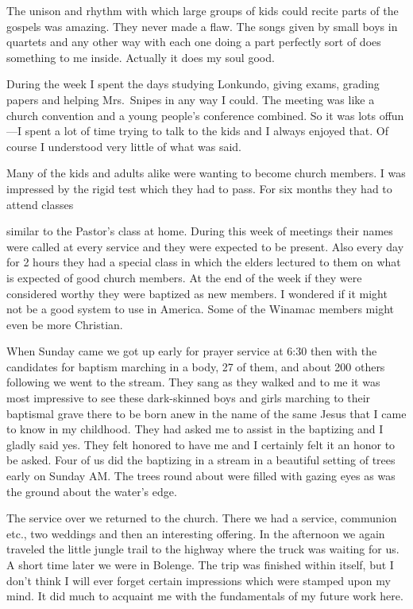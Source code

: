 \documentclass[
]{book}
\begin{document}
The unison and rhythm with which large groups of kids could recite parts of the gospels was amazing. They never made a flaw. The songs given by small boys in quartets and any other way with each one doing a part perfectly sort of does something to me inside. Actually it does my soul good.

During the week I spent the days studying Lonkundo, giving exams, grading papers and helping Mrs.~Snipes in any way I could. The meeting was like a church convention and a young people's conference combined. So it was lots offun---I spent a lot of time trying to talk to the kids and I always enjoyed that. Of course I understood very little of what was said.

Many of the kids and adults alike were wanting to become church members. I was impressed by the rigid test which they had to pass. For six months they had to attend classes

similar to the Pastor's class at home. During this week of meetings their names were called at every service and they were expected to be present. Also every day for 2 hours they had a special class in which the elders lectured to them on what is expected of good church members. At the end of the week if they were considered worthy they were baptized as new members. I wondered if it might not be a good system to use in America. Some of the Winamac members might even be more Christian.

When Sunday came we got up early for prayer service at 6:30 then with the candidates for baptism marching in a body, 27 of them, and about 200 others following we went to the stream. They sang as they walked and to me it was most impressive to see these dark-skinned boys and girls marching to their baptismal grave there to be born anew in the name of the same Jesus that I came to know in my childhood. They had asked me to assist in the baptizing and I gladly said yes. They felt honored to have me and I certainly felt it an honor to be asked. Four of us did the baptizing in a stream in a beautiful setting of trees early on Sunday AM. The trees round about were filled with gazing eyes as was the ground about the water's edge.

The service over we returned to the church. There we had a service, communion etc., two weddings and then an interesting offering. In the afternoon we again traveled the little jungle trail to the highway where the truck was waiting for us. A short time later we were in Bolenge. The trip was finished within itself, but I don't think I will ever forget certain impressions which were stamped upon my mind. It did much to acquaint me with the fundamentals of my future work here.
\end{document}
